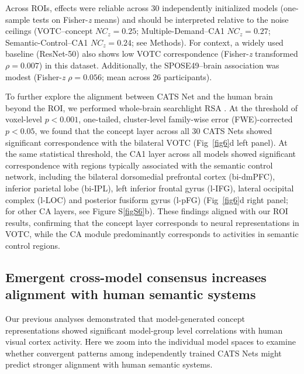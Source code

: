 \documentclass[pdflatex,sn-mathphys-num,lineno]{sn-jnl}%
\begin{document}
\begin{CJK}{UTF8}{gbsn}
Across ROIs, effects were reliable across 30 independently initialized models (one-sample tests on Fisher-\textit{z} means) and should be interpreted relative to the noise ceilings (VOTC–concept $NC_z = 0.25$; Multiple-Demand–CA1 $NC_z = 0.27$; Semantic-Control–CA1 $NC_z = 0.24$; see Methods). For context, a widely used baseline (ResNet-50) also shows low VOTC correspondence (Fisher-\textit{z} transformed $\rho = 0.007$) in this dataset. Additionally, the SPOSE49–brain association was modest (Fisher-\textit{z} $\rho = 0.056$; mean across 26 participants).

To further explore the alignment between CATS Net and the human brain beyond the ROI, we performed whole-brain searchlight RSA \cite{kriegeskorte_information-based_2006}. At the threshold of voxel-level $p < 0.001$, one-tailed, cluster-level family-wise error (FWE)-corrected $p < 0.05$, we found that the concept layer across all 30 CATS Nets showed significant correspondence with the bilateral VOTC (Fig~\ref{fig6}d left panel). At the same statistical threshold, the CA1 layer across all models showed significant correspondence with regions typically associated with the semantic control network, including the bilateral dorsomedial prefrontal cortex (bi-dmPFC), inferior parietal lobe (bi-IPL), left inferior frontal gyrus (l-IFG), lateral occipital complex (l-LOC) and posterior fusiform gyrus (l-pFG) (Fig~\ref{fig6}d right panel; for other CA layers, see Figure S\ref{figS6}b). These findings aligned with our ROI results, confirming that the concept layer corresponds to neural representations in VOTC, while the CA module predominantly corresponds to activities in semantic control regions.

\subsection{Emergent cross-model consensus increases alignment with human semantic systems}
Our previous analyses demonstrated that model-generated concept representations showed significant model-group level correlations with human visual cortex activity. Here we zoom into the individual model spaces to examine whether convergent patterns among independently trained CATS Nets might predict stronger alignment with human semantic systems.


\end{CJK}
\end{document}
